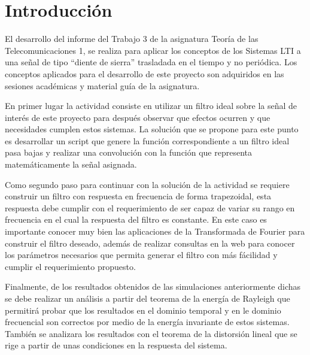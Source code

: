 \section{Introducción}\label{introducción}
El desarrollo del informe del Trabajo 3 de la asignatura Teoría de las Telecomunicaciones 1, se realiza para aplicar los conceptos de los Sistemas LTI a una señal de tipo ``diente de sierra'' trasladada en el tiempo y no periódica. Los conceptos aplicados para el desarrollo de este proyecto son adquiridos en las sesiones académicas y material guía de la asignatura.

En primer lugar la actividad consiste en utilizar un filtro ideal sobre la señal de interés de este proyecto para después observar que efectos ocurren y que necesidades cumplen estos sistemas. La solución que se propone para este punto es desarrollar un script que genere la función correspondiente a un filtro ideal pasa bajas y realizar una convolución con la función que representa matemáticamente la señal asignada.

Como segundo paso para continuar con la solución de la actividad se requiere construir un filtro con respuesta en frecuencia de forma trapezoidal, esta respuesta debe cumplir con el requerimiento de ser capaz de variar su rango en frecuencia en el cual la respuesta del filtro es constante. En este caso es importante conocer muy bien las aplicaciones de la Transformada de Fourier para construir el filtro deseado, además de realizar consultas en la web para conocer los parámetros necesarios que permita generar el filtro con más fácilidad y cumplir el requerimiento propuesto.

Finalmente, de los resultados obtenidos de las simulaciones anteriormente dichas se debe realizar un análisis a partir del teorema de la energía de Rayleigh que permitirá probar que los resultados en el dominio temporal y en le dominio frecuencial son correctos por medio de la energía invariante de estos sistemas. También se analizara los resultados con el teorema de la distorsión lineal que se rige a partir de unas condiciones en la respuesta del sistema.
